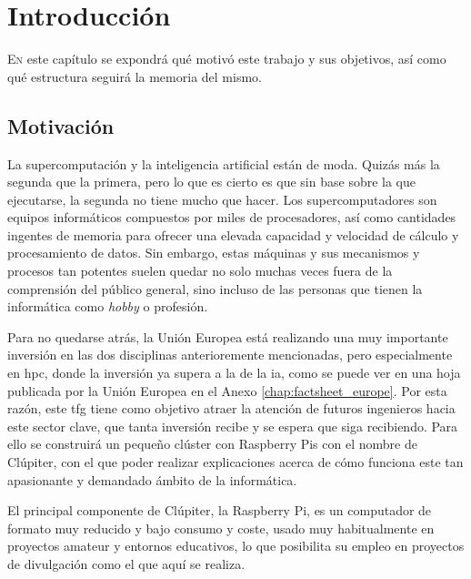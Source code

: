 \chapter{Introducción}
\label{chap:introducion}

\lettrine{E}{n} este capítulo se expondrá qué motivó este trabajo y sus objetivos, así como qué estructura seguirá la memoria del mismo.


\section{Motivación}
\label{sec:motivacion}

La supercomputación y la inteligencia artificial están de moda. Quizás más la segunda que la primera, pero lo que es cierto es que sin base sobre la que ejecutarse, la segunda no tiene mucho que hacer.
Los supercomputadores son equipos informáticos compuestos por miles de procesadores, así como cantidades ingentes de memoria para ofrecer una elevada capacidad y velocidad de cálculo y procesamiento de datos.
Sin embargo, estas máquinas y sus mecanismos y procesos tan potentes suelen quedar no solo muchas veces fuera de la comprensión del público general, sino incluso de las personas que tienen la informática como \textit{hobby} o profesión.

Para no quedarse atrás, la Unión Europea está realizando una muy importante inversión en las dos disciplinas anterioremente mencionadas, pero especialmente en \acrshort{hpc}, donde la inversión ya supera a la de la \acrshort{ia}, como se puede ver en una hoja publicada por la Unión Europea en el Anexo \ref{chap:factsheet_europe}.
Por esta razón, este \acrshort{tfg} tiene como objetivo atraer la atención de futuros ingenieros hacia este sector clave, que tanta inversión recibe y se espera que siga recibiendo. Para ello se construirá un pequeño clúster con Raspberry Pis con el nombre de Clúpiter, con el que poder realizar explicaciones acerca de cómo funciona este tan apasionante y demandado ámbito de la informática.

El principal componente de Clúpiter, la Raspberry Pi, es un computador de formato muy reducido y bajo consumo y coste, usado muy habitualmente en proyectos amateur y entornos educativos, lo que posibilita su empleo en proyectos de divulgación como el que aquí se realiza.

